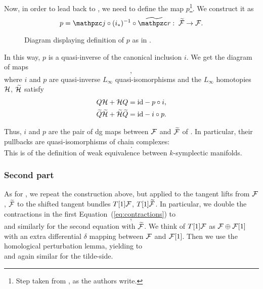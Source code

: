Now, in order to lead back to , we need to define the map $p$\footnote{Step taken from \cite[Section 10.4.6]{Algebraic_operands_key_step}, as the authors write.}.
We construct it as
\begin{equation}
\label{eq:def_p}
    p = \cazz{j} \circ (i_*)^{-1} \circ \wt{\cazz{r}}:
    \; \wt{\F} \rightarrow \F .
\end{equation}
\begin{figure}
    \centering
    
    \caption{Diagram displaying definition of $p$ as in .}
    \label{fig:comm_diagram_def_p}
\end{figure}
In this way, $p$ is a quasi-inverse of the canonical inclusion $i$.
We get the diagram of maps
\begin{equation}
    ,
\end{equation}
where $i$ and $p$ are quasi-inverse $L_\infty$ quasi-isomorphisms and the $L_\infty$ homotopies $\mathcal{H}$, $\widetilde{\mathcal{H}}$ satisfy
\begin{equation}
\label{eq:L_infty_homotopies}
    \begin{aligned}
        Q \mathcal{H} + \mathcal{H} Q =&
        \; \text{id} - p \circ i , \\
        \widetilde{Q} \widetilde{\mathcal{H}} + \widetilde{\mathcal{H}} \widetilde{Q} =&
        \; \text{id} - i \circ p .
    \end{aligned}
\end{equation}

Thus, $i$ and $p$ are the pair of dg maps between $\mathcal{F}$ and $\widetilde{\mathcal{F}}$ of .
In particular, their pullbacks are quasi-isomorphisms of chain complexes:
\begin{equation}
     .
\end{equation}
This is  of the definition of weak equivalence between $k$-symplectic manifolds.

\subsubsection{Second part}
\label{subsubsec:second_part}

As for , we repeat the construction above, but applied to the tangent lifts from $\mathcal{F}$, $\widetilde{\mathcal{F}}$ to the shifted tangent bundles $T[1]\mathcal{F}$, $T[1]\widetilde{\mathcal{F}}$.
In particular, we double the contractions in the first Equation~(\ref{eq:contractions}) to
\begin{equation}
    ,
\end{equation}
and similarly for the second equation with $\widetilde{\mathcal{F}}$.
We think of $T[1]\mathcal{F}$ as $\mathcal{F} \oplus \mathcal{F}[1]$ with an extra differential $\delta$ mapping between $\mathcal{F}$ and $\mathcal{F}[1]$.
Then we use the homological perturbation lemma, yielding to
\begin{equation}
    
\end{equation}
and again similar for the tilde-side.

